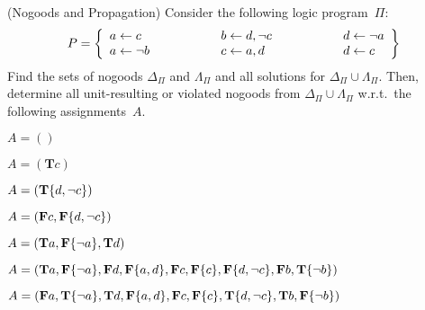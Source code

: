 \begin{Uebung}{(Nogoods and Propagation)}
Consider the following logic program~$\Pi$:
\[
\Pi =
\left\{
\begin{array}{r@{}c@{}l@{\hspace{20mm}}r@{}c@{}l@{\hspace{20mm}}r@{}c@{}l}
a & {} \leftarrow {} & c &
b & {} \leftarrow {} & d,\naf c &
d & {} \leftarrow {} & \naf a
\\
a & {} \leftarrow {} & \naf b &
c & {} \leftarrow {} & a,d &
d & {} \leftarrow {} & c
\end{array}
\right\}
\]
Find the sets of nogoods $\Delta_\Pi$ and $\Lambda_\Pi$
and all solutions for $\Delta_\Pi\cup\Lambda_\Pi$.
Then, determine all unit-resulting or violated nogoods from 
$\Delta_\Pi\cup\Lambda_\Pi$ w.r.t.\ the following assignments~$A$.
\begin{UList}
\item
$A=\left(\right)$
\item
$A=\left(\mathbf{T}c\right)$
\item
$A=\left(\mathbf{T}\{d,{\neg{c}}\}\right)$
\item
$A=\left(\mathbf{F}c,\mathbf{F}\{d,{\neg{c}}\}\right)$
\item
$A=\left(\mathbf{T}a,\mathbf{F}\{{\neg{a}}\},\mathbf{T}d\right)$
\item
$A=\left(\mathbf{T}a,\mathbf{F}\{{\neg{a}}\},\mathbf{F}d,\mathbf{F}\{a,d\},\mathbf{F}c,\mathbf{F}\{c\},\mathbf{F}\{d,{\neg{c}}\},\mathbf{F}b,\mathbf{T}\{{\neg{b}}\}\right)$
\item
$A=\left(\mathbf{F}a,\mathbf{T}\{{\neg{a}}\},\mathbf{T}d,\mathbf{F}\{a,d\},\mathbf{F}c,\mathbf{F}\{c\},\mathbf{T}\{d,{\neg{c}}\},\mathbf{T}b,\mathbf{F}\{{\neg{b}}\}\right)$
\end{UList}
\end{Uebung}

